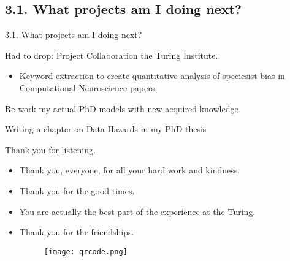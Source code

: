 \documentclass[t]{beamer}
\begin{document}
\subsection{3.1. What projects am I doing next?}
\begin{frame}{3.1. What projects am I doing next?}
  	\begin{block}{Had to drop: Project Collaboration the Turing Institute.}
    	\begin{itemize}    
    		\item Keyword extraction to create quantitative analysis of speciesist bias in Computational Neuroscience papers. 
    				\end{itemize}  
	\end{block}
 
  	\begin{block}{Re-work my actual PhD models with new acquired knowledge}
	\end{block}
        \begin{block}{Writing a chapter on Data Hazards in my PhD thesis}
	\end{block}
\end{frame}



\begin{frame}{Thank you for listening.}	
    \begin{itemize}
        \item Thank you, everyone, for all your hard work and kindness. 
        \item Thank you for the good times. 
        \item You are actually the best part of the experience at the Turing.
        \item Thank you for the friendships.
        \begin{figure}
				\vspace{-\blocktitlesize}\texttt{[image: qrcode.png]}
			\end{figure}
    \end{itemize}
\end{frame}
\end{document}
